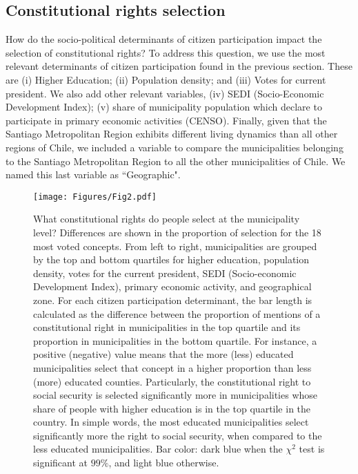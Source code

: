 \documentclass[onecolumn]{article}
\begin{document}



\subsection*{Constitutional rights selection}
\label{sec:ccs}

How do the socio-political determinants of citizen participation impact the selection of constitutional rights? To address this question, we use the most relevant determinants of citizen participation found in the previous section. These are (i) Higher Education; (ii) Population density; and (iii) Votes for current president. We also add other relevant variables, (iv) SEDI (Socio-Economic Development Index); (v) share of municipality population which declare to participate in primary economic activities (CENSO). Finally, given that the Santiago Metropolitan Region exhibits different living dynamics than all other regions of Chile, we included a variable to compare the municipalities belonging to the Santiago Metropolitan Region to all the other municipalities of Chile. We named this last variable as ``Geographic". 

\begin{figure}[!t]
\centering
\texttt{[image: Figures/Fig2.pdf]}
\caption{What constitutional rights do people select at the municipality level? Differences are shown in the proportion of selection for the 18 most voted concepts. From left to right, municipalities are grouped by the top and bottom quartiles for higher education, population density, votes for the current president, SEDI (Socio-economic Development Index), primary economic activity, and geographical zone.  For each citizen participation determinant, the bar length is calculated as the difference between the proportion of mentions of a constitutional right in municipalities in the top quartile and its proportion in municipalities in the bottom quartile. For instance, a positive (negative) value means that the more (less) educated municipalities select that concept in a higher proportion than less (more) educated counties. Particularly, the constitutional right to social security is selected significantly more in municipalities whose share of people with higher education is in the top quartile in the country. In simple words, the most educated municipalities select significantly more the right to social security, when compared to the less educated municipalities. Bar color: dark blue when the $\chi ^2$ test is significant at $99\%$, and light blue otherwise.} 
\label{fig:derechos}
\end{figure}
\end{document}
